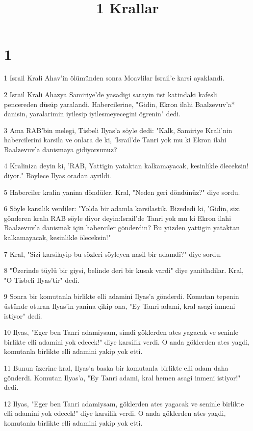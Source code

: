 

\title{1 Krallar}


\chapter{1}

\par 1 Israil Krali Ahav'in ölümünden sonra Moavlilar Israil'e karsi ayaklandi.
\par 2 Israil Krali Ahazya Samiriye'de yasadigi sarayin üst katindaki kafesli pencereden düsüp yaralandi. Habercilerine, "Gidin, Ekron ilahi Baalzevuv'a* danisin, yaralarimin iyilesip iyilesmeyecegini ögrenin" dedi.
\par 3 Ama RAB'bin melegi, Tisbeli Ilyas'a söyle dedi: "Kalk, Samiriye Krali'nin habercilerini karsila ve onlara de ki, 'Israil'de Tanri yok mu ki Ekron ilahi Baalzevuv'a danismaya gidiyorsunuz?
\par 4 Kraliniza deyin ki, 'RAB, Yattigin yataktan kalkamayacak, kesinlikle öleceksin! diyor." Böylece Ilyas oradan ayrildi.
\par 5 Haberciler kralin yanina döndüler. Kral, "Neden geri döndünüz?" diye sordu.
\par 6 Söyle karsilik verdiler: "Yolda bir adamla karsilastik. Bizededi ki, 'Gidin, sizi gönderen krala RAB söyle diyor deyin:Israil'de Tanri yok mu ki Ekron ilahi Baalzevuv'a danismak için haberciler gönderdin? Bu yüzden yattigin yataktan kalkamayacak, kesinlikle öleceksin!"
\par 7 Kral, "Sizi karsilayip bu sözleri söyleyen nasil bir adamdi?" diye sordu.
\par 8 "Üzerinde tüylü bir giysi, belinde deri bir kusak vardi" diye yanitladilar. Kral, "O Tisbeli Ilyas'tir" dedi.
\par 9 Sonra bir komutanla birlikte elli adamini Ilyas'a gönderdi. Komutan tepenin üstünde oturan Ilyas'in yanina çikip ona, "Ey Tanri adami, kral asagi inmeni istiyor" dedi.
\par 10 Ilyas, "Eger ben Tanri adamiysam, simdi göklerden ates yagacak ve seninle birlikte elli adamini yok edecek!" diye karsilik verdi. O anda göklerden ates yagdi, komutanla birlikte elli adamini yakip yok etti.
\par 11 Bunun üzerine kral, Ilyas'a baska bir komutanla birlikte elli adam daha gönderdi. Komutan Ilyas'a, "Ey Tanri adami, kral hemen asagi inmeni istiyor!" dedi.
\par 12 Ilyas, "Eger ben Tanri adamiysam, göklerden ates yagacak ve seninle birlikte elli adamini yok edecek!" diye karsilik verdi. O anda göklerden ates yagdi, komutanla birlikte elli adamini yakip yok etti.
